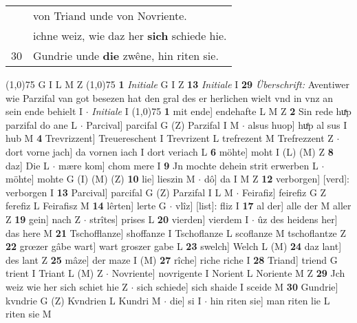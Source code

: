 \documentclass[8pt,a4paper,notitlepage]{article}
\begin{document}
\begin{table}[ht]
\begin{minipage}[t]{0.5\linewidth}
\begin{tabular}{rl}
 & von Triand unde von Novriente.\\ 
 & ichne weiz, wie daz her \textbf{sich} schiede hie.\\ 
30 & Gundrie unde \textbf{die} zwêne, hin riten sie.\\ 
\end{tabular}
\scriptsize
\line(1,0){75} \newline
G I L M Z \newline
\line(1,0){75} \newline
\textbf{1} \textit{Initiale} G I Z  \textbf{13} \textit{Initiale} I  \textbf{29} \textit{Überschrift:} Aventiwer wie Parzifal van got besezen hat den gral des er herlichen wielt vnd in vnz an sein ende behielt I   $\cdot$ \textit{Initiale} I  \newline
\line(1,0){75} \newline
\textbf{1} mit ende] endehafte L M Z \textbf{2} Sin rede huͯp parzifal do ane L  $\cdot$ Parcival] parcifal G (Z) Parzifal I M  $\cdot$ alsus huop] huͤp al sus I hub M \textbf{4} Trevrizzent] Treuereschent I Trevrizent L trefrezent M Trefrezzent Z  $\cdot$ dort vorne jach] da vornen iach I dort veriach L \textbf{6} möhte] moht I (L) (M) Z \textbf{8} daz] Die L  $\cdot$ mære kom] chom mere I \textbf{9} Jn mochte dehein strit erwerben L  $\cdot$ möhte] mohte G (I) (M) (Z) \textbf{10} lie] lieszin M  $\cdot$ dô] da I M Z \textbf{12} verborgen] [verd]: verborgen I \textbf{13} Parcival] parcifal G (Z) Parzifal I L M  $\cdot$ Feirafiz] feirefiz G Z ferefiz L Feirafisz M \textbf{14} lêrten] lerte G  $\cdot$ vlîz] [list]: fliz I \textbf{17} al der] alle der M aller Z \textbf{19} gein] nach Z  $\cdot$ strîtes] prises L \textbf{20} vierden] vierdem I  $\cdot$ ûz des heidens her] das here M \textbf{21} Tschofflanze] shoffanze I Tschoflanze L scoflanze M tschoflantze Z \textbf{22} grœzer gâbe wart] wart groszer gabe L \textbf{23} swelch] Welch L (M) \textbf{24} daz lant] des lant Z \textbf{25} mâze] der maze I (M) \textbf{27} rîche] riche riche I \textbf{28} Triand] triend G trient I Triant L (M) Z  $\cdot$ Novriente] novrigente I Norient L Noriente M Z \textbf{29} Jch weiz wie her sich schiet hie Z  $\cdot$ sich schiede] sich shaide I sceide M \textbf{30} Gundrie] kvndrie G (Z) Kvndrien L Kundri M  $\cdot$ die] si I  $\cdot$ hin riten sie] man riten lie L riten sie M \newline
\end{minipage}
\hspace{0.5cm}
\begin{minipage}[t]{0.5\linewidth}
\small

\end{minipage}
\end{table}
\end{document}

